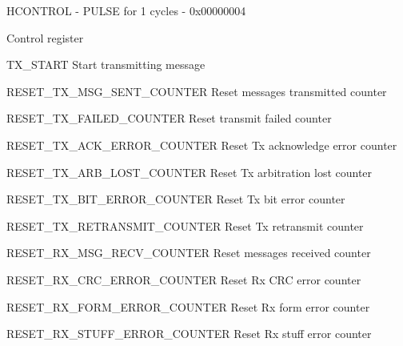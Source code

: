 \documentclass{article}
\begin{document}
\begin{register}{H}{CONTROL - PULSE for 1 cycles - }{0x00000004}  \par Control register \regnewline
  \label{CONTROL}
\regnewline
  \begin{regdesc}\begin{reglist}
    \item [TX{\_}START] Start transmitting message    \item [RESET{\_}TX{\_}MSG{\_}SENT{\_}COUNTER] Reset messages transmitted counter    \item [RESET{\_}TX{\_}FAILED{\_}COUNTER] Reset transmit failed counter    \item [RESET{\_}TX{\_}ACK{\_}ERROR{\_}COUNTER] Reset Tx acknowledge error counter    \item [RESET{\_}TX{\_}ARB{\_}LOST{\_}COUNTER] Reset Tx arbitration lost counter    \item [RESET{\_}TX{\_}BIT{\_}ERROR{\_}COUNTER] Reset Tx bit error counter    \item [RESET{\_}TX{\_}RETRANSMIT{\_}COUNTER] Reset Tx retransmit counter    \item [RESET{\_}RX{\_}MSG{\_}RECV{\_}COUNTER] Reset messages received counter    \item [RESET{\_}RX{\_}CRC{\_}ERROR{\_}COUNTER] Reset Rx CRC error counter    \item [RESET{\_}RX{\_}FORM{\_}ERROR{\_}COUNTER] Reset Rx form error counter    \item [RESET{\_}RX{\_}STUFF{\_}ERROR{\_}COUNTER] Reset Rx stuff error counter  \end{reglist}\end{regdesc}
\end{register}
\end{document}
